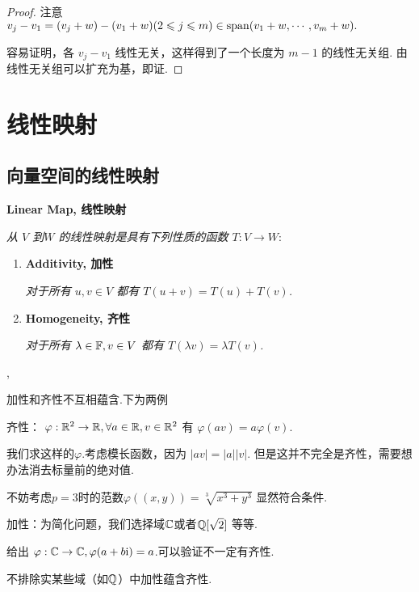 \documentclass[cn,hazy,blue,14pt,screen]{elegantnote}
\begin{document}
\begin{proof}
    注意 $v_j-v_1=(v_j+w)-(v_1+w) (2\leqslant j\leqslant m) \in \operatorname{span} (v_1+w,\cdots,v_m+w).$

    容易证明，各 $v_j-v_1$ 线性无关，这样得到了一个长度为 $m-1$ 的线性无关组. 由线性无关组可以扩充为基，即证.
\end{proof}

\newpage
\section{线性映射}

\subsection{向量空间的线性映射}

\begin{definition}
    \normalfont \textbf{Linear Map, 线性映射}

    \itshape 从 $V$ 到$W$ 的线性映射是具有下列性质的函数 $T:V\to W:$

    \begin{enumerate}
        \item \normalfont \textbf{Additivity, 加性}
        
        \itshape \quad 对于所有 $u,v\in V$ 都有 $T(u+v) = T(u)+T(v)$.
        \item \normalfont \textbf{Homogeneity, 齐性}
        
        \itshape \quad 对于所有 $\lambda\in\mathbb{F},v\in V$ 都有 $T(\lambda v) = \lambda T(v)$.
    \end{enumerate}
    \sep

    \begin{remark}
        加性和齐性不互相蕴含.下为两例

        齐性： $\varphi : \mathbb{R}^2\to\mathbb{R},\forall a\in\mathbb{R},v\in\mathbb{R}^2$ 有 $\varphi(av)=a\varphi(v).$

        我们求这样的$\varphi$.考虑模长函数，因为 $\left|av\right|=\left|a\right|\left|v\right|$. 但是这并不完全是齐性，需要想办法消去标量前的绝对值.

        不妨考虑$p=3$时的范数$\varphi((x,y))=\sqrt[3]{x^3+y^3}$ 显然符合条件.

        加性：为简化问题，我们选择域$\mathbb{C}$或者$\mathbb{Q} [\sqrt{2}]$ 等等.

        给出 $\varphi :\mathbb{C} \to \mathbb{C}, \varphi(a+b\mathrm{i}) =a$.可以验证不一定有齐性.

        \begin{note}
            不排除实某些域（如$\mathbb{Q}$）中加性蕴含齐性.
        \end{note}
    \end{remark}
\end{definition}
\end{document}
